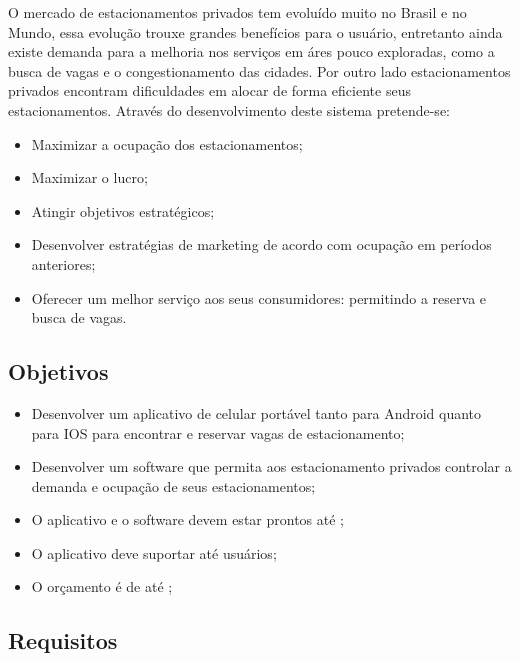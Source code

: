 O mercado de estacionamentos privados tem evoluído muito no Brasil e no Mundo, essa evolução trouxe grandes benefícios para o usuário, entretanto ainda existe demanda para a melhoria nos serviços em áres pouco exploradas, como a busca de vagas e o congestionamento das cidades.
Por outro lado estacionamentos privados encontram dificuldades em alocar de forma eficiente seus estacionamentos.
Através do desenvolvimento deste sistema pretende-se:
\begin{itemize}
	\item Maximizar a ocupação dos estacionamentos;%
	\item Maximizar o lucro;
	\item Atingir objetivos estratégicos;
	\item Desenvolver estratégias de marketing de acordo com ocupação em períodos anteriores;
	\item Oferecer um melhor serviço aos seus consumidores: permitindo a reserva e busca de vagas.
\end{itemize}


\subsection{Objetivos}


\begin{itemize}
	\item Desenvolver um aplicativo de celular portável tanto para Android quanto para IOS para encontrar e reservar vagas de estacionamento;
	\item Desenvolver um software que permita aos estacionamento privados controlar a demanda e ocupação de seus estacionamentos;
	\item O aplicativo e o software devem estar prontos até \maximumDeadline;
	\item O aplicativo deve suportar até \minimumUsersAmount usuários;
	\item O orçamento é de até \maximumBudget;
\end{itemize}


\subsection{Requisitos}

